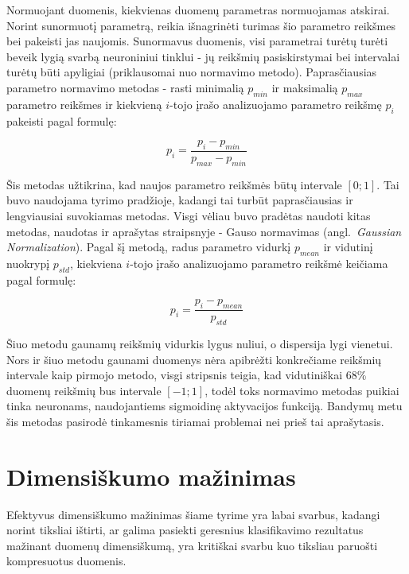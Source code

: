 \documentclass{VUMIFPSbakalaurinis}
\begin{document}
Normuojant duomenis, kiekvienas duomenų parametras normuojamas atskirai.
Norint sunormuotį parametrą, reikia išnagrinėti turimas šio parametro reikšmes bei pakeisti jas naujomis.
Sunormavus duomenis, visi parametrai turėtų turėti beveik lygią svarbą neuroniniui tinklui - jų reikšmių pasiskirstymai bei intervalai turėtų būti apyligiai (priklausomai nuo normavimo metodo).
Paprasčiausias parametro normavimo metodas - rasti minimalią $p_{min}$ ir maksimalią $p_{max}$ parametro reikšmes ir kiekvieną $i$-tojo įrašo analizuojamo parametro reikšmę $p_i$ pakeisti pagal formulę:

\begin{equation}
p_i = \frac{p_i - p_{min}}{p_{max} - p_{min}}
\end{equation}

Šis metodas užtikrina, kad naujos parametro reikšmės būtų intervale $[0; 1]$.
Tai buvo naudojama tyrimo pradžioje, kadangi tai turbūt paprasčiausias ir lengviausiai suvokiamas metodas.
Visgi vėliau buvo pradėtas naudoti kitas metodas, naudotas ir aprašytas \cite[817~psl.]{gaussian} straipsnyje - Gauso normavimas (angl.~\textit{Gaussian Normalization}).
Pagal šį metodą, radus parametro vidurkį $p_{mean}$ ir vidutinį nuokrypį $p_{std}$, kiekviena $i$-tojo įrašo analizuojamo parametro reikšmė keičiama pagal formulę:

\begin{equation}
p_i = \frac{p_i - p_{mean}}{p_{std}}
\end{equation}

Šiuo metodu gaunamų reikšmių vidurkis lygus nuliui, o dispersija lygi vienetui.
Nors ir šiuo metodu gaunami duomenys nėra apibrėžti konkrečiame reikšmių intervale kaip pirmojo metodo, visgi \cite[817~psl.]{gaussian} stripsnis teigia, kad vidutiniškai 68\% duomenų reikšmių bus intervale $[-1; 1]$, todėl toks normavimo metodas puikiai tinka neuronams, naudojantiems sigmoidinę aktyvacijos funkciją.
Bandymų metu šis metodas pasirodė tinkamesnis tiriamai problemai nei prieš tai aprašytasis.



\section{Dimensiškumo mažinimas}

Efektyvus dimensiškumo mažinimas šiame tyrime yra labai svarbus, kadangi norint tiksliai ištirti, ar galima pasiekti geresnius klasifikavimo rezultatus mažinant duomenų dimensiškumą, yra kritiškai svarbu kuo tiksliau paruošti kompresuotus duomenis.
\end{document}
